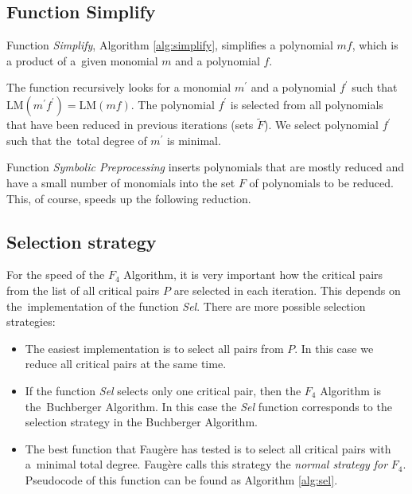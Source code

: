 

\subsection{Function Simplify}
Function \textit{Simplify}, Algorithm \ref{alg:simplify}, simplifies a polynomial $m f$, which is a product of a~given monomial $m$ and a polynomial $f$.

The function recursively looks for a monomial $m^\prime$ and a polynomial $f^\prime$ such that $\textrm{LM}(m^\prime f^\prime) = \textrm{LM}(m f)$. The polynomial $f^\prime$ is selected from all polynomials that have been reduced in previous iterations (sets $\tilde{F}$). We select polynomial $f^\prime$ such that the~total degree of $m^\prime$ is minimal.

Function \textit{Symbolic Preprocessing} inserts polynomials that are mostly reduced and have a small number of monomials into the set $F$ of polynomials to be reduced. This, of course, speeds up the following reduction.



\subsection{Selection strategy}
\label{subsec:F4:sel}
For the speed of the $F_4$ Algorithm, it is very important how the critical pairs from the list of all critical pairs $P$ are selected in each iteration. This depends on the~implementation of the function \textit{Sel}. There are more possible selection strategies:

\begin{itemize}
  \item The easiest implementation is to select all pairs from $P$. In this case we reduce all critical pairs at the same time.
  \item If the function \textit{Sel} selects only one critical pair, then the $F_4$ Algorithm is the~Buchberger Algorithm. In this case the \textit{Sel} function corresponds to the selection strategy in the Buchberger Algorithm.
  \item The best function that Faug\`ere has tested is to select all critical pairs with a~minimal total degree. Faug\`ere calls this strategy the \textit{normal strategy for} $F_4$. Pseudocode of this function can be found as Algorithm \ref{alg:sel}.
\end{itemize}



